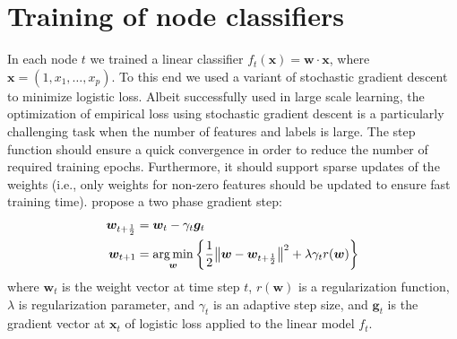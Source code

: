 \documentclass{article}
\renewcommand{\vec}[1]{\boldsymbol{#1}}
\newcommand{\bx}{\vec{x}}
\newcommand{\bw}{\vec{w}}
\newcommand{\heta}{\hat{\eta}}
\newcommand{\Path}[1]{\mathrm{Path}(#1)}
\newcommand{\given}{\, | \,}
\DeclarePairedDelimiter{\norm}{\lVert}{\rVert}
\DeclareMathOperator*{\argmin}{\arg \min}
\begin{document}
%

\section{Training of node classifiers}
\label{sec:training_of_node_classifiers}

In each node $t$ we trained a linear classifier $f_t(\bx) = \bw \cdot \bx$, where $\bx = (1, x_1, \ldots, x_p)$.  To this end we used a variant of stochastic gradient descent to minimize logistic loss. Albeit successfully used in large scale learning, the optimization of empirical loss using stochastic gradient descent is a particularly challenging task when the number of features and labels is large. The step function should ensure a quick convergence in order to reduce the number of required training epochs. Furthermore, it should support sparse updates of the weights (i.e., only weights for non-zero features should be updated to ensure fast training time). %
\citet{Duchi_Singer_2009} propose a two phase gradient step:
\begin{align*}
	\label{eq:fobos}
	\bm{w}_{t+\frac12} &= \bm{w}_t - \gamma_t \bm{g}_t\\
	\bm{w}_{t+1} &= \argmin_{\bm{w}}\left\{ \frac12 \norm[\big]{ \bm{w} - \bm{w}_{t+\frac12}}^2
	+ \lambda \gamma_{t} r(\bm{w})\right\}
\end{align*}
where $\bm{w}_t$ is the weight vector at time step $t$, $r(\bm{w})$ is a
regularization function, $\lambda$ is regularization parameter, and $\gamma_t$ is an adaptive step size, and $\bm{g}_t$ is the gradient vector at $\bm{x}_t$ of logistic loss applied to the linear model $f_t$. 
\end{document}

